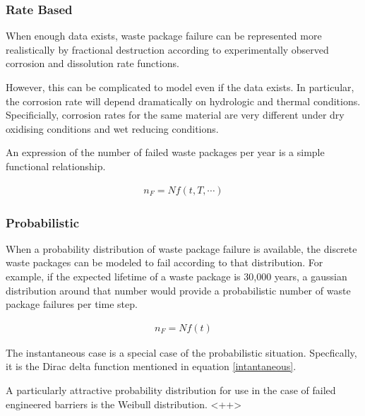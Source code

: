 \subsubsection{Rate Based} 

When enough data exists, waste package failure can
be represented more  realistically by fractional destruction according to
experimentally observed corrosion and dissolution rate functions.

However, this can be complicated to model even if the data exists. In
particular, the corrosion rate will depend dramatically on hydrologic and
thermal conditions. Specificially, corrosion rates for the same material are
very different under dry oxidising conditions and wet reducing conditions. 


An expression of the number of failed waste packages per year is a simple 
functional relationship. 

\begin{align}
  n_F = Nf(t,T,\cdots)
  \label{rate}
\end{align}

\subsubsection{Probabilistic}

When a probability distribution of waste package failure is available, the 
discrete waste packages can be modeled to fail according to that distribution. 
For example, if the expected lifetime of a waste package is 30,000 years, a 
gaussian distribution around that number would provide a probabilistic number of 
waste package failures per time step. 

\begin{align}
  n_F=Nf(t)
  \label{probabilistic}
\end{align}

The instantaneous case is a special case of the probabilistic situation. 
Specfically, it is the Dirac delta function mentioned in equation 
\eqref{intantaneous}.

A particularly attractive probability distribution for use in the case of failed 
engineered barriers is the Weibull distribution. <++>

